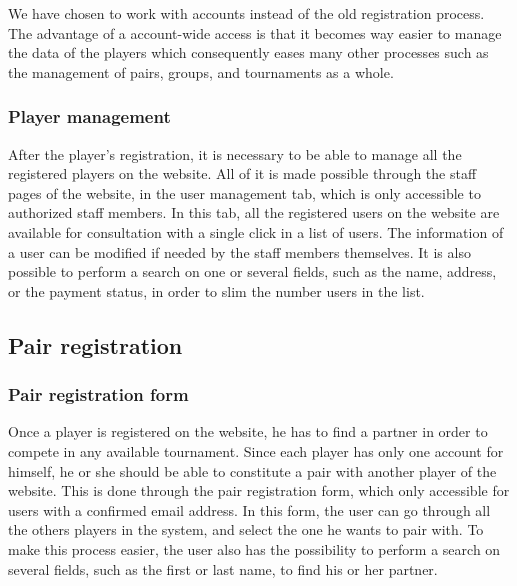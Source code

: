 We have chosen to work with accounts instead of the old registration process.
The advantage of a account-wide access is that it becomes way easier
to manage the data of the players which consequently eases many other
processes such as the management of pairs, groups, and tournaments as a whole.

\subsubsection{Player management}
\label{subs:Player management}


After the player's registration, it is necessary to be able to manage all the
registered players on the website. All of it is made possible through the staff
pages of the website, in the user management tab, which is only accessible
to authorized staff members. In this tab, all the registered users on the
website are available for consultation with a single click in a list of users.
The information of a user can be modified if needed by the staff members
themselves. It is also possible to perform a search on one or several fields,
such as the name, address, or the payment status, in order to slim the number
users in the list.

\subsection{Pair registration}
\label{sub:Pair registration}

\subsubsection{Pair registration form}
\label{subs:Pair registration form}


Once a player is registered on the website, he has to find a partner in order
to compete in any available tournament. Since each player has only one account
for himself, he or she should be able to constitute a pair with another
player of the website. This is done through the pair registration form,
which only accessible for users with a confirmed email address. In this form,
the user can go through all the others players in the system, and select
the one he wants to pair with. To make this process easier, the user also has
the possibility to perform a search on several fields, such as the first or
last name, to find his or her partner. \newline

